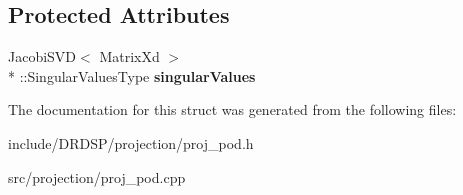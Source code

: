 \subsection*{Protected Attributes}
\begin{DoxyCompactItemize}
\item 
\hypertarget{struct_d_r_d_s_p_1_1_proj_p_o_d_a063bb5fe4abf916c3c7108164de3c5fe}{Jacobi\-S\-V\-D$<$ Matrix\-Xd $>$\\*
\-::Singular\-Values\-Type {\bfseries singular\-Values}}\label{struct_d_r_d_s_p_1_1_proj_p_o_d_a063bb5fe4abf916c3c7108164de3c5fe}

\end{DoxyCompactItemize}


The documentation for this struct was generated from the following files\-:\begin{DoxyCompactItemize}
\item 
include/\-D\-R\-D\-S\-P/projection/proj\-\_\-pod.\-h\item 
src/projection/proj\-\_\-pod.\-cpp\end{DoxyCompactItemize}
